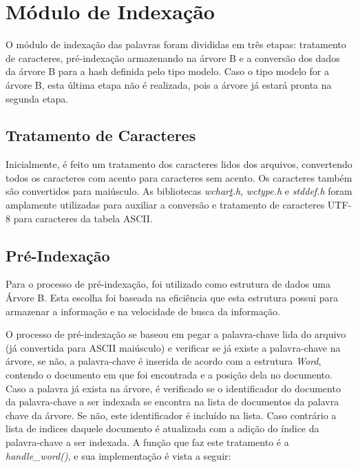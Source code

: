 \documentclass[a4paper,12pt]{article}
\begin{document}
\section{Módulo de Indexação}
O módulo de indexação das palavras foram divididas em três etapas: tratamento de caracteres, pré-indexação armazenando na árvore B e 
a conversão dos dados da árvore B para a hash definida pelo tipo modelo. Caso o tipo modelo for a árvore B, esta última etapa 
não é realizada, pois a árvore já estará pronta na segunda etapa.

\subsection{Tratamento de Caracteres}
Inicialmente, é feito um tratamento dos caracteres lidos dos arquivos, convertendo todos os caracteres com acento para caracteres sem 
acento. Os caracteres também são convertidos para maiúsculo. 
As bibliotecas \emph{wchar\underline t.h}, \emph{wctype.h} e \emph{stddef.h} foram amplamente utilizadas para auxiliar a conversão e tratamento de 
caracteres UTF-8 para caracteres da tabela ASCII.

\subsection{Pré-Indexação}
Para o processo de pré-indexação, foi utilizado como estrutura de dados uma Árvore B. Esta escolha foi baseada na eficiência que esta 
estrutura possui para armazenar a informação e na velocidade de busca da informação.

O processo de pré-indexação se baseou em pegar a palavra-chave lida do arquivo (já convertida para ASCII maiúsculo) e 
verificar se já existe a palavra-chave na árvore, se não, a palavra-chave é inserida de acordo com a estrutura \emph{Word}, contendo 
o documento em que foi encontrada e a posição dela no documento. Caso a palavra já exista na árvore, é verificado se o 
identificador do documento da palavra-chave a ser indexada se encontra na lista de documentos da palavra chave da árvore. Se não, 
este identificador é incluído na lista. Caso contrário a lista de indices daquele documento é atualizada com a adição do índice da 
palavra-chave a ser indexada. A função que faz este tratamento é a \emph{handle\_word()}, e sua implementação é vista 
a seguir:
\end{document}
